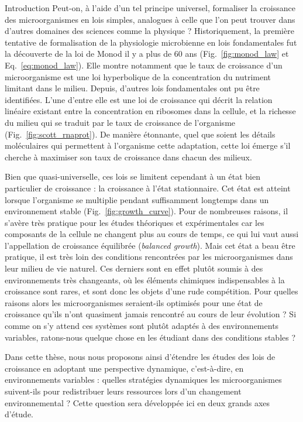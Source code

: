 \begin{chapter_summary}{Introduction}
Peut-on, à l'aide d'un tel principe universel, formaliser la croissance des microorganismes en lois simples, analogues à celle que l'on peut trouver dans d'autres domaines des sciences comme la physique ?
Historiquement, la première tentative de formalisation de la physiologie microbienne en lois fondamentales fut la découverte de la loi de Monod il y a plus de 60 ans (Fig.~\ref{fig:monod_law} et Eq.~\ref{eq:monod_law}).
Elle montre notamment que le taux de croissance d'un microorganisme est une loi hyperbolique de la concentration du nutriment limitant dans le milieu.
Depuis, d'autres lois fondamentales ont pu être identifiées.
L'une d'entre elle est une loi de croissance qui décrit la relation linéaire existant entre la concentration en ribosomes dans la cellule, et la richesse du milieu qui se traduit par le taux de croissance de l'organisme (Fig.~\ref{fig:scott_rnaprot}).
De manière étonnante, quel que soient les détails moléculaires qui permettent à l'organisme cette adaptation, cette loi émerge s'il cherche à maximiser son taux de croissance dans chacun des milieux.

Bien que quasi-universelle, ces lois se limitent cependant à un état bien particulier de croissance : la croissance à l'état stationnaire.
Cet état est atteint lorsque l'organisme se multiplie pendant suffisamment longtemps dans un environnement stable (Fig.~\ref{fig:growth_curve}).
Pour de nombreuses raisons, il s'avère très pratique pour les études théoriques et expérimentales car les composants de la cellule ne changent plus au cours de temps, ce qui lui vaut aussi l'appellation de croissance équilibrée (\textit{balanced growth}).
Mais cet état a beau être pratique, il est très loin des conditions rencontrées par les microorganismes dans leur milieu de vie naturel.
Ces derniers sont en effet plutôt soumis à des environnements très changeants, où les éléments chimiques indispensables à la croissance sont rares, et sont donc les objets d'une rude compétition.
Pour quelles raisons alors les microorganismes seraient-ils optimisés pour une état de croissance qu'ils n'ont quasiment jamais rencontré au cours de leur évolution ?
Si comme on s'y attend ces systèmes sont plutôt adaptés à des environnements variables, ratons-nous quelque chose en les étudiant dans des conditions stables ?

Dans cette thèse, nous nous proposons ainsi d'étendre les études des lois de croissance en adoptant une perspective dynamique, c'est-à-dire, en environnements variables : quelles stratégies dynamiques les microorganismes suivent-ils pour redistribuer leurs ressources lors d'un changement environnemental ?
Cette question sera développée ici en deux grands axes d'étude.


\end{chapter_summary}
